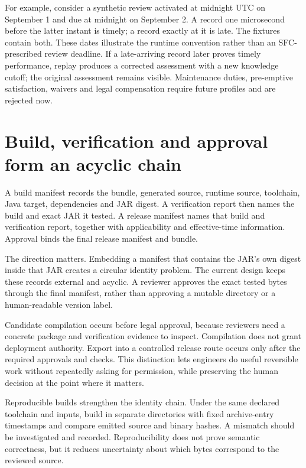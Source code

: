 \documentclass[12pt,a4paper,oneside,openany]{book}
\begin{document}
For example, consider a synthetic review activated at midnight UTC on September
1 and due at midnight on September 2. A record one microsecond before the latter
instant is timely; a record exactly at it is late. The fixtures contain both.
These dates illustrate the runtime convention rather than an SFC-prescribed
review deadline. If a late-arriving record later proves timely performance,
replay produces a corrected assessment with a new knowledge cutoff; the original
assessment remains visible. Maintenance duties, pre-emptive satisfaction,
waivers and legal compensation require future profiles and are rejected now.

\section{Build, verification and approval form an acyclic chain}
\label{merge:M07:12}


A build manifest records the bundle, generated source, runtime source, toolchain,
Java target, dependencies and JAR digest. A verification report then names the
build and exact JAR it tested. A release manifest names that build and verification
report, together with applicability and effective-time information. Approval
binds the final release manifest and bundle.

The direction matters. Embedding a manifest that contains the JAR's own digest
inside that JAR creates a circular identity problem. The current design keeps
these records external and acyclic. A reviewer approves the exact tested bytes
through the final manifest, rather than approving a mutable directory or a
human-readable version label.

Candidate compilation occurs before legal approval, because reviewers need a
concrete package and verification evidence to inspect. Compilation does not grant
deployment authority. Export into a controlled release route occurs only after
the required approvals and checks. This distinction lets engineers do useful
reversible work without repeatedly asking for permission, while preserving the
human decision at the point where it matters.

Reproducible builds strengthen the identity chain. Under the same declared
toolchain and inputs, build in separate directories with fixed archive-entry
timestamps and compare emitted source and binary hashes. A mismatch should be
investigated and recorded. Reproducibility does not prove semantic correctness,
but it reduces uncertainty about which bytes correspond to the reviewed source.
\end{document}
